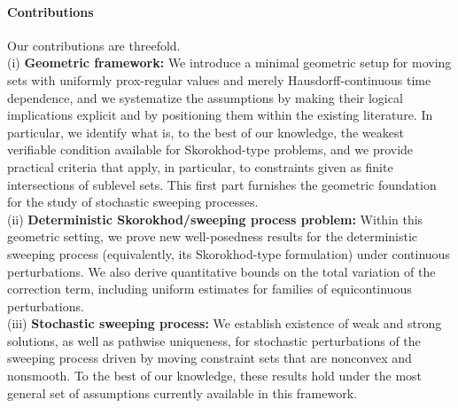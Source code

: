 \documentclass[preprint,12pt]{elsarticle}
\newcommand{\EV}[1]{\todo[color=blue!40]{#1}}
\renewcommand{\H}{\mathcal{H}}
\theoremstyle{plain}
\theoremstyle{definition}
\theoremstyle{remark}
\begin{document}

\paragraph{Contributions}
Our contributions are threefold.\\
(i) \textbf{Geometric framework:} We introduce a minimal geometric setup for moving sets with uniformly prox-regular values and merely Hausdorff-continuous time dependence, and we
systematize the assumptions by making their logical implications explicit and
by positioning them within the existing literature. In particular, we identify
what is, to the best of our knowledge, the weakest verifiable condition
available for Skorokhod-type problems, and we provide practical criteria that
apply, in particular, to constraints given as finite intersections of sublevel
sets. This first part furnishes the geometric foundation for the study of
 stochastic sweeping processes.\\
\noindent (ii) \textbf{Deterministic Skorokhod/sweeping process problem:} Within this geometric setting, we
prove new well-posedness results for the deterministic sweeping process
(equivalently, its Skorokhod-type formulation) under continuous perturbations.
We also derive quantitative bounds on the total variation of the correction
term, including uniform estimates for families of equicontinuous perturbations.\\
\noindent (iii) \textbf{Stochastic sweeping process:} We establish existence of weak and
strong solutions, as well as pathwise uniqueness, for stochastic perturbations
of the sweeping process driven by moving constraint sets that are nonconvex and
nonsmooth. To the best of our knowledge, these results hold under the most
general set of assumptions currently available in this framework.
\end{document}
